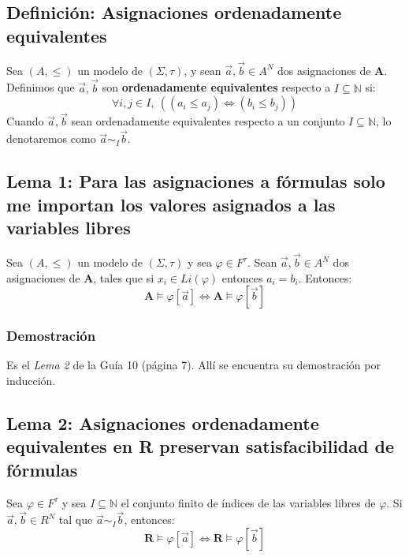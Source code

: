\documentclass{article}
\begin{document}
\subsection*{Definición: Asignaciones ordenadamente equivalentes}
Sea $(A,\leq)$ un modelo de $(\Sigma,\tau)$, y sean $\vec{a},\vec{b}\in A^N$ dos asignaciones de $\textbf{A}$. Definimos que $\vec{a},\vec{b}$ son \textbf{ordenadamente equivalentes} respecto a $I\subseteq\mathbb{N}$ si:
$$\forall i,j\in I,\ ((a_i\leq a_j)\iff(b_i\leq b_j))$$
Cuando $\vec{a},\vec{b}$ sean ordenadamente equivalentes respecto a un conjunto $I\subseteq\mathbb{N}$, lo denotaremos como $\vec{a}\sim_I\vec{b}$.

\subsection*{Lema 1: Para las asignaciones a fórmulas solo me importan los valores asignados a las variables libres}
Sea $(A,\leq)$ un modelo de $(\Sigma,\tau)$ y sea $\varphi\in F^\tau$. Sean $\vec{a},\vec{b}\in A^N$ dos asignaciones de $\mathbf{A}$, tales que si $x_i\in Li(\varphi)$ entonces $a_i=b_i$. Entonces:
\begin{equation*}
  \mathbf{A}\vDash\varphi[\vec{a}]\iff\mathbf{A}\vDash\varphi[\vec{b}]
\end{equation*}

\subsubsection*{Demostración}
Es el \textit{Lema 2} de la Guía 10 (página 7). Allí se encuentra su demostración por inducción.

\subsection*{Lema 2: Asignaciones ordenadamente equivalentes en R preservan satisfacibilidad de fórmulas}
Sea $\varphi\in F^\tau$ y sea $I\subseteq\mathbb{N}$ el conjunto finito de índices de las variables libres de $\varphi$. Si $\vec{a},\vec{b}\in R^N$ tal que $\vec{a}\sim_I\vec{b}$, entonces:
\begin{equation*}
  \mathbf{R}\vDash\varphi[\vec{a}]\iff \mathbf{R}\vDash\varphi[\vec{b}]
\end{equation*}
\end{document}
